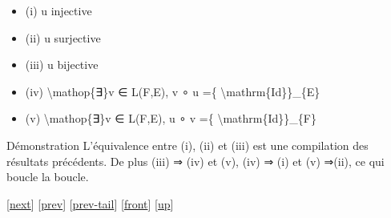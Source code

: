 \documentclass[]{article}
\begin{document}
\begin{itemize}
\itemsep1pt\parskip0pt
\item
  (i) u injective
\item
  (ii) u surjective
\item
  (iii) u bijective
\item
  (iv) \textbackslash{}mathop\{∃\}v ∈ L(F,E), v ∘ u =\{
  \textbackslash{}mathrm\{Id\}\}\_\{E\}
\item
  (v) \textbackslash{}mathop\{∃\}v ∈ L(F,E), u ∘ v =\{
  \textbackslash{}mathrm\{Id\}\}\_\{F\}
\end{itemize}

Démonstration L'équivalence entre (i), (ii) et (iii) est une compilation
des résultats précédents. De plus (iii) ⇒ (iv) et (v), (iv) ⇒ (i) et (v)
⇒(ii), ce qui boucle la boucle.

{[}\href{coursse10.html}{next}{]} {[}\href{coursse8.html}{prev}{]}
{[}\href{coursse8.html\#tailcoursse8.html}{prev-tail}{]}
{[}\href{coursse9.html}{front}{]}
{[}\href{coursch3.html\#coursse9.html}{up}{]}
\end{document}
